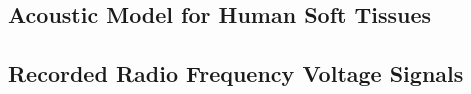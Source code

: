 \subsection{Acoustic Model for Human Soft Tissues}


\subsection{Recorded Radio Frequency Voltage Signals}

